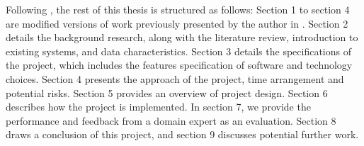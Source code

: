 Following \cite{Laramee2011}, the rest of this thesis is structured as follows: Section 1 to section 4 are modified versions of work previously presented by the author in \cite{Liu}. Section 2 details the background research, along with the literature review, introduction to existing systems, and data characteristics. Section 3 details the specifications of the project, which includes the features specification of software and technology choices. Section 4 presents the approach of the project, time arrangement and potential risks. Section 5 provides an overview of project design. Section 6 describes how the project is implemented. In section 7, we provide the performance and feedback from a domain expert as an evaluation. Section 8 draws a conclusion of this project, and section 9 discusses potential further work. 

